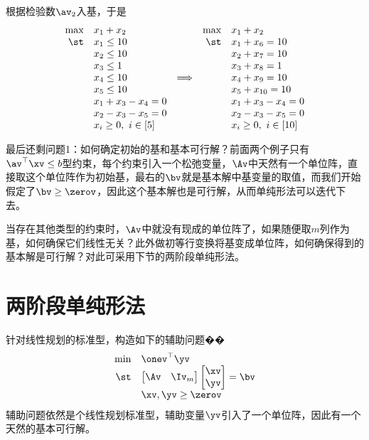 \documentclass{ctexart}
\begin{document}
\begin{example}[用修正单纯形法求最大流问题]
    根据检验数$\av_2$入基，于是
    \begin{align}
        \begin{array}{rlcrl} \label{eq: flow-standard}
            \max & x_1 + x_2              &                 & \max & x_1 + x_2               \\
            \st  & x_1 \le 10             &                 & \st  & x_1 + x_6 = 10          \\
                 & x_2 \le 10             &                 &      & x_2 + x_7 = 10          \\
                 & x_3 \le 1              &                 &      & x_3 + x_8 = 1           \\
                 & x_4 \le 10             & \Longrightarrow &      & x_4 + x_9 = 10          \\
                 & x_5 \le 10             &                 &      & x_5 + x_{10} = 10       \\
                 & x_1 + x_3 - x_4 = 0    &                 &      & x_1 + x_3 - x_4 = 0     \\
                 & x_2 - x_3 - x_5 = 0    &                 &      & x_2 - x_3 - x_5 = 0     \\
                 & x_i \ge 0, ~ i \in [5] &                 &      & x_i \ge 0, ~ i \in [10]
        \end{array}
    \end{align}
\end{example}


最后还剩问题1：如何确定初始的基和基本可行解？前面两个例子只有$\av^\top \xv \le b$型约束，每个约束引入一个松弛变量，$\Av$中天然有一个单位阵，直接取这个单位阵作为初始基，最右的$\bv$就是基本解中基变量的取值，而我们开始假定了$\bv \ge \zerov$，因此这个基本解也是可行解，从而单纯形法可以迭代下去。

当存在其他类型的约束时，$\Av$中就没有现成的单位阵了，如果随便取$m$列作为基，如何确保它们线性无关？此外做初等行变换将基变成单位阵，如何确保得到的基本解是可行解？对此可采用下节的两阶段单纯形法。

\section{两阶段单纯形法}

针对线性规划的标准型，构造如下的辅助问题��
\begin{align*}
    \begin{array}{rl}
        \min & \onev^\top \yv      \\
        \st  & \begin{bmatrix}
                   \Av & \Iv_m
               \end{bmatrix}
        \begin{bmatrix}
            \xv \\ \yv
        \end{bmatrix} = \bv        \\
             & \xv, \yv \ge \zerov
    \end{array}
\end{align*}
辅助问题依然是个线性规划标准型，辅助变量$\yv$引入了一个单位阵，因此有一个天然的基本可行解。
\end{document}
